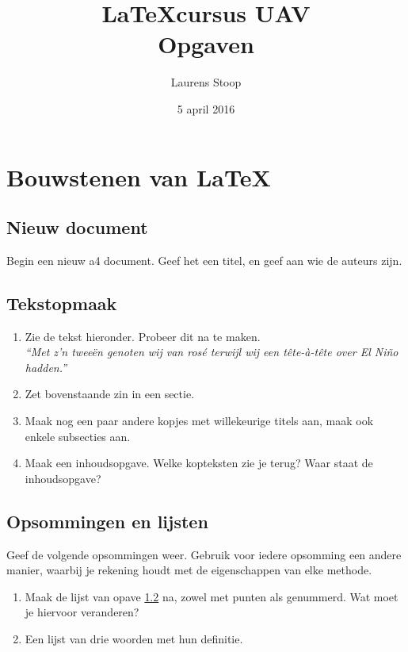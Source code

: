 \documentclass{article}
\begin{document}
	\title{\LaTeX cursus UAV \\ Opgaven}
	\author{Laurens Stoop}
	\date{5 april 2016}
	\maketitle




\section{Bouwstenen van \LaTeX}

\subsection{Nieuw document}
Begin een nieuw a4 document. Geef het een titel, en geef aan wie de auteurs zijn. 

\subsection{Tekstopmaak}\label{opmaak}
\begin{enumerate}
	\item Zie de tekst hieronder. Probeer dit na te maken.\\[.1cm]
	\emph{``Met z'n twee\"en genoten wij van ros\'e terwijl wij een t\^ete-\`a-t\^ete over El Ni\~no hadden.''}
	\item Zet bovenstaande zin in een sectie.
	\item Maak nog een paar andere kopjes met willekeurige titels aan, maak ook enkele subsecties aan.
	\item Maak een inhoudsopgave. Welke kopteksten zie je terug? Waar staat de inhoudsopgave?
\end{enumerate}


\subsection{Opsommingen en lijsten}
Geef de volgende opsommingen weer. Gebruik voor iedere opsomming een andere manier, waarbij je rekening houdt met de eigenschappen van elke methode.
\begin{enumerate}
	\item Maak de lijst van opave \ref{opmaak} na, zowel met punten als genummerd. Wat moet je hiervoor veranderen?
	\item Een lijst van drie woorden met hun definitie.
\end{enumerate}
\end{document}
